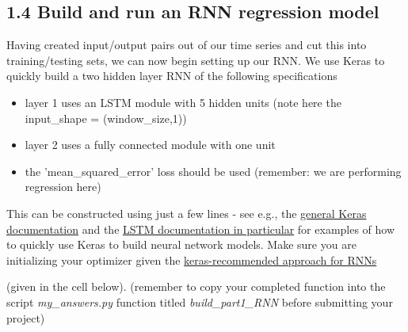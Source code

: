 \documentclass[11pt]{article}
\providecommand{\tightlist}{%
      \setlength{\itemsep}{0pt}\setlength{\parskip}{0pt}}
\begin{document}
    \subsection{1.4 Build and run an RNN regression
model}\label{build-and-run-an-rnn-regression-model}

Having created input/output pairs out of our time series and cut this
into training/testing sets, we can now begin setting up our RNN. We use
Keras to quickly build a two hidden layer RNN of the following
specifications

\begin{itemize}
\tightlist
\item
  layer 1 uses an LSTM module with 5 hidden units (note here the
  input\_shape = (window\_size,1))
\item
  layer 2 uses a fully connected module with one unit
\item
  the 'mean\_squared\_error' loss should be used (remember: we are
  performing regression here)
\end{itemize}

This can be constructed using just a few lines - see e.g., the
\href{https://keras.io/getting-started/sequential-model-guide/}{general
Keras documentation} and the
\href{https://keras.io/layers/recurrent/}{LSTM documentation in
particular} for examples of how to quickly use Keras to build neural
network models. Make sure you are initializing your optimizer given the
\href{https://keras.io/optimizers/}{keras-recommended approach for RNNs}

(given in the cell below). (remember to copy your completed function
into the script \emph{my\_answers.py} function titled
\emph{build\_part1\_RNN} before submitting your project)
\end{document}
